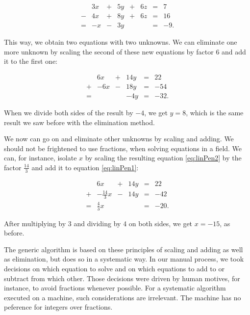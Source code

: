 \documentclass[tikz]{scrreprt}
\begin{document}
\begin{equation}\label{eq:linPen2}
\begin{array}{crcrcrcr}
  & 3x & + & 5y  & + & 6z & = &  7\\
- & 4x & + & 8y  & + & 6z & = & 16\\
= & -x & - & 3y  &   &    & = & -9.
\end{array}
\end{equation}

This way, we obtain two equations with two unknowns.
We can eliminate one more unknown by scaling the second
of these new equations by factor 6 and add it to the
first one:

\begin{equation}
\begin{array}{crcrcr}
  &  6x & + & 14y  & = &  22\\
+ & -6x & - & 18y  & = & -54\\
= &     &   & -4y  & = & -32.
\end{array}
\end{equation}

When we divide both sides of the result by $-4$,
we get $y = 8$, which is the same result we saw
before with the elimination method.

We now can go on and eliminate other unknowns
by scaling and adding. We should not be frightened
to use fractions, when solving equations in a field.
We can, for instance, isolate $x$ by scaling
the resulting equation \ref{eq:linPen2} by the factor
$\frac{14}{3}$ and add it to equation \ref{eq:linPen1}:

\begin{equation}
\begin{array}{crcrcr}
  &             6x & + & 14y  & = &  22\\
+ & -\frac{14}{3}x & - & 14y  & = & -42\\
= &  \frac{4}{3}x  &   &      & = & -20.
\end{array}
\end{equation}

After multiplying by $3$ and dividing by 4 on both sides,
we get $x = -15$, as before.

The generic algorithm is based on
these principles of scaling and adding as well as elimination,
but does so in a systematic way. In our manual process,
we took decisions on which equation to solve and on which
equations to add to or subtract from which other. 
Those decisions 
were driven by human motives, for instance, to avoid
fractions whenever possible. For a systematic algorithm
executed on a machine, such considerations are irrelevant.
The machine has no peference for integers over fractions.
\end{document}
